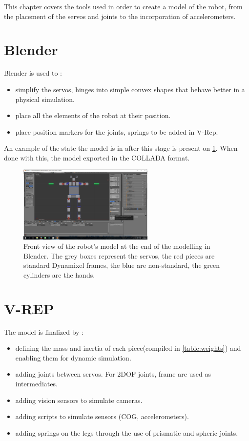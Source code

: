 This chapter covers the tools used in order to create a model of the robot, from the placement of the servos and joints to the incorporation of accelerometers.

\section{Blender}
Blender is used to :
\begin{itemize}
\item simplify the servos, hinges into simple convex shapes that behave better in a physical simulation.
\item place all the elements of the robot at their position.
\item place position markers for the joints, springs to be added in V-Rep.
\end{itemize}
An example of the state the model is in after this stage is present on \cref{fig:modelling_blender}. When done with this, the model exported in the COLLADA format.

\begin{figure}[htp]
\center
\includegraphics[width=0.6\textwidth]{figures/modelling_blender}
\caption[Front view of the robot's model at the end of the modelling in Blender]{Front view of the robot's model at the end of the modelling in Blender. The grey boxes represent the servos, the red pieces are standard Dynamixel frames, the blue are non-standard, the green cylinders are the hands.}
\label{fig:modelling_blender}
\end{figure}

\section{V-REP}
The model is finalized by :
\begin{itemize}
\item defining the mass and inertia of each piece(compiled in \cref{table:weights}) and enabling them for dynamic simulation.
\item adding joints between servos. For 2DOF joints, frame are used as intermediates.
\item adding vision sensors to simulate cameras.
\item adding scripts to simulate sensors (COG, accelerometers).
\item adding springs on the legs through the use of prismatic and spheric joints.
\end{itemize}

